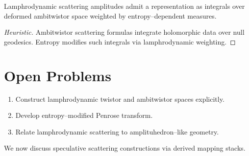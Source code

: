 \begin{proposition}[Speculative]
Lamphrodynamic scattering amplitudes admit a representation as
integrals over deformed ambitwistor space weighted by entropy--dependent
measures.
\end{proposition}

\begin{proof}[Heuristic]
Ambitwistor scattering formulas integrate holomorphic data over null
geodesics. Entropy modifies such integrals via lamphrodynamic weighting.
\end{proof}


\section{Open Problems}

\begin{enumerate}
\item Construct lamphrodynamic twistor and ambitwistor spaces explicitly.
\item Develop entropy--modified Penrose transform.
\item Relate lamphrodynamic scattering to amplituhedron--like geometry.
\end{enumerate}

\medskip
\noindent
We now discuss speculative scattering constructions via derived mapping
stacks.

\newpage
